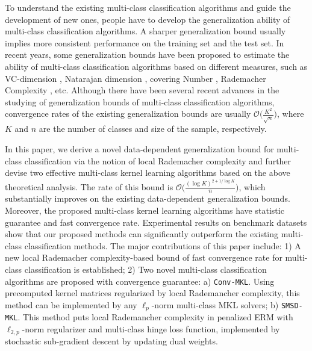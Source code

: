 \documentclass{article}
\begin{document}
To understand the existing multi-class classification algorithms and guide the development of new ones,
people have to develop the generalization ability of multi-class classification algorithms.
A sharper generalization bound usually implies more consistent
performance on the training set and the test set.
In recent years, some generalization bounds have been proposed to
estimate the ability of multi-class classification algorithms based on different measures,
such as
VC-dimension \cite{allwein2000reducing},
Natarajan dimension \cite{daniely2014optimal},
covering Number \cite{guermeur2002combining,zhang2004statistical,Hill2007},
Rademacher Complexity \cite{koltchinskii2002empirical,mohri2012foundations,cortes2013multi}, etc.
Although there have been several recent advances in the studying of
generalization bounds of multi-class classification algorithms,
convergence rates of the existing generalization bounds are usually %
 $\mathcal{O}\big(\frac{K^2}{\sqrt{n}}\big)$,
where $K$ and $n$ are the number of classes and size of the sample, respectively.



In this paper, we derive a novel data-dependent generalization bound for multi-class classification
via the notion of local Rademacher complexity and
further devise two effective multi-class kernel learning algorithms based on the above theoretical analysis.
The rate of this bound is $\mathcal{O}\big(\frac{(\log K)^{2+{1}/{\log K}}}{n}\big)$,
which substantially improves on  the existing data-dependent generalization bounds.
Moreover, the proposed multi-class kernel learning algorithms have statistic guarantee and fast convergence rate.
Experimental results on benchmark datasets show that our proposed methods can significantly
outperform the existing multi-class classification methods.
The major contributions of this paper include:
 1) A new local Rademacher complexity-based bound of fast convergence rate for multi-class classification is established;
 2) Two novel multi-class classification algorithms are proposed with convergence guarantee: a) \texttt{Conv-MKL}.
Using precomputed kernel matrices regularized by local Rademancher complexity,
this method can be implemented by any $\ell_p$-norm multi-class MKL solvers;
b) \texttt{SMSD-MKL}.
This method puts local Rademancher complexity
in penalized ERM with $\ell_{2,p}$-norm regularizer and multi-class hinge loss function,
implemented by stochastic sub-gradient descent by updating dual weights.


\end{document}

